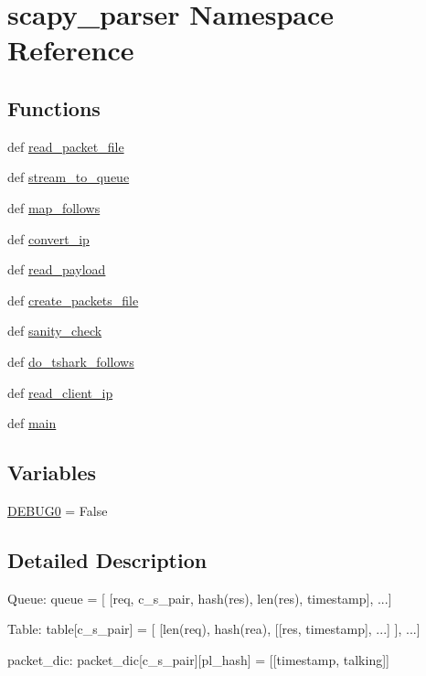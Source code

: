 \hypertarget{namespacescapy__parser}{\section{scapy\-\_\-parser Namespace Reference}
\label{namespacescapy__parser}
}
\subsection*{Functions}
\begin{DoxyCompactItemize}
\item 
def \hyperlink{namespacescapy__parser_afe4115215cb92dd83c69c093ca1dc39c}{read\-\_\-packet\-\_\-file}
\item 
def \hyperlink{namespacescapy__parser_a8380a4cd72a24b37c31aa940f9e46ca8}{stream\-\_\-to\-\_\-queue}
\item 
def \hyperlink{namespacescapy__parser_ab235f32be59c5d52d6a4741e261b48ec}{map\-\_\-follows}
\item 
def \hyperlink{namespacescapy__parser_ad232477d220b14b000fad3dac1d948a1}{convert\-\_\-ip}
\item 
def \hyperlink{namespacescapy__parser_ad297d10c555e7fbcfccf73cee8e38256}{read\-\_\-payload}
\item 
def \hyperlink{namespacescapy__parser_a402e671cc2705b00b5f66d9b3dd57f34}{create\-\_\-packets\-\_\-file}
\item 
def \hyperlink{namespacescapy__parser_a907496fe847749d57c9e2f07359b4ccc}{sanity\-\_\-check}
\item 
def \hyperlink{namespacescapy__parser_a91451a1858fe0e45095ea130b7fa0165}{do\-\_\-tshark\-\_\-follows}
\item 
def \hyperlink{namespacescapy__parser_a64e52994b8f6fd553cdaa44b2047f61c}{read\-\_\-client\-\_\-ip}
\item 
def \hyperlink{namespacescapy__parser_a5f96040fae556e80468aae165afaf565}{main}
\end{DoxyCompactItemize}
\subsection*{Variables}
\begin{DoxyCompactItemize}
\item 
\hyperlink{namespacescapy__parser_ab5c773d1946dd024ca6f829ba3354d2d}{D\-E\-B\-U\-G0} = False
\end{DoxyCompactItemize}


\subsection{Detailed Description}
\begin{DoxyVerb}Queue:
    queue = [ [req, c_s_pair, hash(res), len(res), timestamp], ...]

Table:
    table[c_s_pair] = [ [len(req), hash(rea), [[res, timestamp], ...] ], ...]

packet_dic:
    packet_dic[c_s_pair][pl_hash] = [[timestamp, talking]]
\end{DoxyVerb}
 


